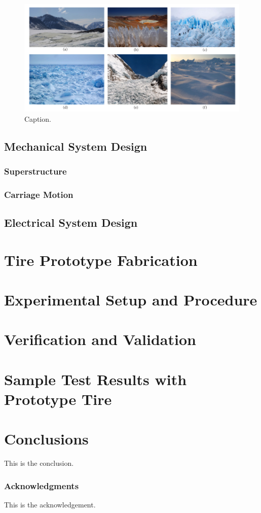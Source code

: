 \documentclass{article}
\begin{document}
\begin{figure}[hbt!]
\centering
\includegraphics[width=6.5in]{general-images/earth-analog-sites.pdf}
\caption{Caption.}
\label{fig:earth-analog-sites}
\end{figure}

\subsection{Mechanical System Design}


\subsubsection{Superstructure}


\subsubsection{Carriage Motion}
\label{subsubsec:carriage-motion}

\subsection{Electrical System Design}

\section{Tire Prototype Fabrication}
\label{sec:tire-prototyoe-fabrication}


\section{Experimental Setup and Procedure}


\section{Verification and Validation}


\section{Sample Test Results with Prototype Tire}

\section{Conclusions}

This is the conclusion.

\subsubsection*{Acknowledgments}
This is the acknowledgement.



\end{document}
